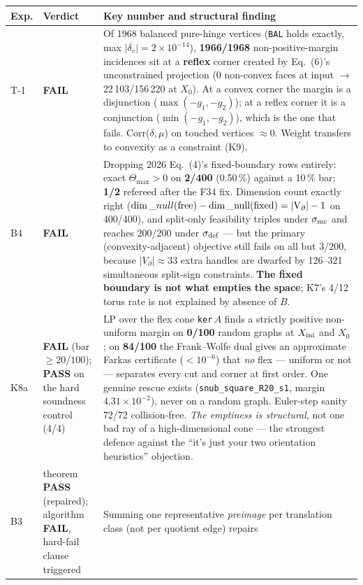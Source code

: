\documentclass[10pt,a4paper]{article}
\newcommand{\fn}[1]{\nolinkurl{#1}}
\begin{document}
\begin{table}[h]\centering\small
\begin{tabular}{@{}p{9mm}p{18mm}p{115mm}@{}}
\toprule
Exp. & Verdict & Key number and structural finding \\
\midrule
T-1 & \textbf{FAIL} & Of 1968 balanced pure-hinge vertices (\texttt{BAL} holds exactly, max
$|\delta_v|=2\times10^{-14}$), \textbf{1966/1968} non-positive-margin incidences sit at a
\textbf{reflex} corner created by Eq.~(6)'s unconstrained projection (0 non-convex faces at input
$\to$ 22\,103/156\,220 at $X_0$). At a convex corner the margin is a disjunction
($\max(-g_1,-g_2)$); at a reflex corner it is a conjunction ($\min(-g_1,-g_2)$), which is the one
that fails. Corr($\delta,\mu$) on touched vertices $\approx0$. Weight transfers to convexity as a
constraint (K9). \\
B4 & \textbf{FAIL} & Dropping 2026 Eq.~(4)'s fixed-boundary rows entirely: exact
$\Theta_{\max}>0$ on \textbf{2/400} (0.50\,\%) against a 10\,\% bar; \textbf{1/2} refereed after
the F34 fix. Dimension count exactly right ($\dim\_null(\rm free)-\dim\_null(\rm fixed) =
|V_\partial|-1$ on 400/400), and split-only feasibility triples under $\sigma_{\rm mc}$ and
reaches 200/200 under $\sigma_{\rm def}$ --- but the primary (convexity-adjacent) objective still
fails on all but 3/200, because $|V_\partial|\approx33$ extra handles are dwarfed by 126--321
simultaneous split-sign constraints. \textbf{The fixed boundary is not what empties the space};
K7's 4/12 torus rate is not explained by absence of \(B\). \\
K8a & \textbf{FAIL} (bar $\ge20/100$); \textbf{PASS} on the hard soundness control (4/4) & LP over
the flex cone \fn{ker}\,$A$ finds a strictly positive non-uniform margin on \textbf{0/100} random
graphs at $X_{\rm ini}$ and $X_0$; on \textbf{84/100} the Frank--Wolfe dual gives an approximate
Farkas certificate ($<10^{-6}$) that \emph{no} flex --- uniform or not --- separates every cut and
corner at first order. One genuine rescue exists (\fn{snub\_square\_R20\_s1}, margin
$4.31\times10^{-2}$), never on a random graph. Euler-step sanity 72/72 collision-free. \emph{The
emptiness is structural}, not one bad ray of a high-dimensional cone --- the strongest defence
against the ``it's just your two orientation heuristics'' objection. \\
B3 & theorem \textbf{PASS} (repaired); algorithm \textbf{FAIL}, hard-fail clause triggered &
Summing one representative \emph{preimage} per translation class (not per quotient edge) repairs

\end{tabular}
\end{table}
\end{document}
